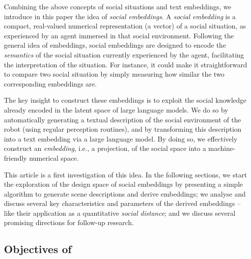 \begin{rewrite}
Combining the above concepts of social situations and text embeddings, we introduce in
this paper the idea of \emph{social embeddings}. A \emph{social embedding} is a
compact, real-valued numerical representation (a vector) of a social
situation, as experienced by an agent immersed in that social environment.
Following the general idea of embeddings, social embeddings are designed
to encode the \emph{semantics} of the social situation currently experienced by
the agent, facilitating the interpretation of the situation. For instance, it
could make it straightforward to compare two social situation by simply
measuring how similar the two corresponding embeddings are.

The key insight to construct these embeddings is to exploit the social knowledge
already encoded in the latent space of large language models. We do so by
automatically generating a textual description of the social environment of the
robot (using regular perception routines), and by transforming this
description into a text embedding via a large language model. By doing so, we
effectively construct an \emph{embedding}, i.e., a projection, of the social
space into a machine-friendly numerical space.

This article is a first investigation of this idea. In the following sections,
we start the exploration of the design space of social embeddings by presenting
a simple algorithm to generate scene descriptions and derive embeddings; we
analyse and discuss several key characteristics and parameters of the derived
embeddings -- like their application as a quantitative \emph{social distance};
and we discuss several promising directions for follow-up research.

\end{rewrite}

\subsection{Objectives of \project}
\label{sec:objectives}


